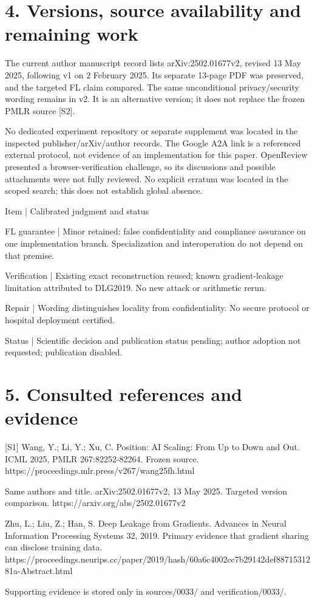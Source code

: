 \documentclass[10pt]{article}
\begin{document}
\section*{4. Versions, source availability and remaining work}
The current author manuscript record lists arXiv:2502.01677v2, revised 13 May 2025, following v1 on 2 February 2025. Its separate 13-page PDF was preserved, and the targeted FL claim compared. The same unconditional privacy/security wording remains in v2. It is an alternative version; it does not replace the frozen PMLR source [S2].\par
No dedicated experiment repository or separate supplement was located in the inspected publisher/arXiv/author records. The Google A2A link is a referenced external protocol, not evidence of an implementation for this paper. OpenReview presented a browser-verification challenge, so its discussions and possible attachments were not fully reviewed. No explicit erratum was located in the scoped search; this does not establish global absence.\par
Item | Calibrated judgment and status\par
FL guarantee | Minor retained: false confidentiality and compliance assurance on one implementation branch. Specialization and interoperation do not depend on that premise.\par
Verification | Existing exact reconstruction reused; known gradient-leakage limitation attributed to DLG2019. No new attack or arithmetic rerun.\par
Repair | Wording distinguishes locality from confidentiality. No secure protocol or hospital deployment certified.\par
Status | Scientific decision and publication status pending; author adoption not requested; publication disabled.\par
\section*{5. Consulted references and evidence}
[S1] Wang, Y.; Li, Y.; Xu, C. Position: AI Scaling: From Up to Down and Out. ICML 2025, PMLR 267:82252-82264. Frozen source. https://proceedings.mlr.press/v267/wang25fh.html\par
Same authors and title. arXiv:2502.01677v2, 13 May 2025. Targeted version comparison. https://arxiv.org/abs/2502.01677v2\par
Zhu, L.; Liu, Z.; Han, S. Deep Leakage from Gradients. Advances in Neural Information Processing Systems 32, 2019. Primary evidence that gradient sharing can disclose training data. https://proceedings.neurips.cc/paper/2019/hash/60a6c4002cc7b29142def8871531281a-Abstract.html\par
Supporting evidence is stored only in sources/0033/ and verification/0033/.\par
\end{document}
